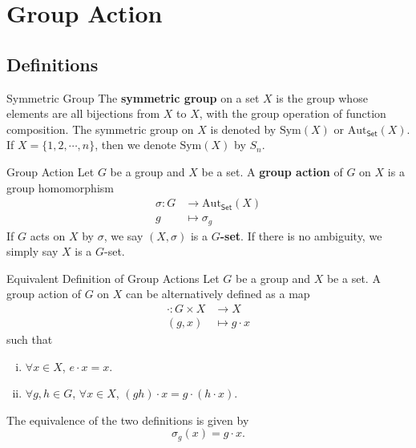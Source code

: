 \section{Group Action}
\subsection{Definitions}
\begin{definition}{Symmetric Group}{}
    The \textbf{symmetric group} on a set $X$ is the group whose elements are all bijections from $X$ to $X$, with the group operation of function composition. The symmetric group on $X$ is denoted by $\mathrm{Sym}(X)$ or $\mathrm{Aut}_{\mathsf{Set}}(X)$. If $X=\{1,2,\cdots,n\}$, then we denote $\mathrm{Sym}(X)$ by $S_n$.
\end{definition}

\begin{definition}{Group Action}{}
    Let $G$ be a group and $X$ be a set. A \textbf{group action} of $G$ on $X$ is a group homomorphism
    \begin{align*}
        \sigma:G & \longrightarrow \mathrm{Aut}_{\mathsf{Set}}(X) \\
        g        & \longmapsto \sigma_g
    \end{align*}
    If $G$ acts on $X$ by $\sigma$, we say $(X,\sigma)$ is a \textbf{$G$-set}. If there is no ambiguity, we simply say $X$ is a $G$-set.
\end{definition}



\begin{proposition}{Equivalent Definition of Group Actions}{}
    Let $G$ be a group and $X$ be a set. A group action of $G$ on $X$ can be alternatively defined as a map
    \begin{align*}
        \cdot:G\times X & \longrightarrow X    \\
        (g,x)           & \longmapsto g\cdot x
    \end{align*}
    such that
    \begin{enumerate}[(i)]
        \item $\forall x\in X$, $e\cdot x=x$.
        \item $\forall g,h\in G$, $\forall x\in X$, $(gh)\cdot x=g\cdot(h\cdot x)$.
    \end{enumerate}
    The equivalence of the two definitions is given by
    \[
        \sigma_g(x)=g\cdot x.
    \]
\end{proposition}

